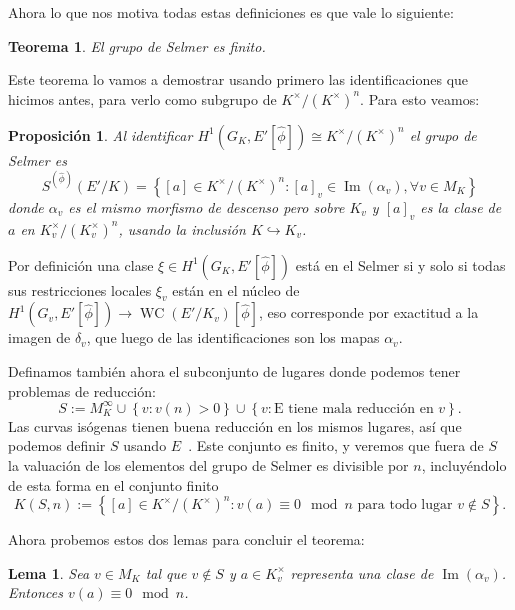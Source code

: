 \documentclass[a4paper]{book}
\theoremstyle{definition}
\theoremstyle{plain}
\newtheorem*{theorem*}{Teorema}
\newtheorem*{lemma*}{Lema}
\newtheorem*{prop*}{Proposición}
\DeclareMathOperator{\im}{Im}
\newcommand{\KmodN}{K^\times/{(K^\times)}^n}
\newcommand{\lla}{\left\lbrace}
\newcommand{\rla}{\right\rbrace}
\begin{document}
Ahora lo que nos motiva todas estas definiciones es que vale lo siguiente:

\begin{theorem*}
El grupo de Selmer es finito.
\end{theorem*}

Este teorema lo vamos a demostrar usando primero las identificaciones que hicimos antes, para verlo como subgrupo de $\KmodN$. Para esto veamos:

\begin{prop*}
Al identificar $H^1(G_K,E'[\hat\phi]) \cong \KmodN$ el grupo de Selmer es
\[
S^{(\hat\phi)}(E'/K) = \lla [a] \in \KmodN : {[a]}_v \in \im(\alpha_v), \forall v\in M_K \rla
\]
donde $\alpha_v$ es el mismo morfismo de descenso pero sobre $K_v$ y ${[a]}_v$ es la clase de $a$ en $K_v^\times/{(K_v^\times)}^n$, usando la inclusión $K\hookrightarrow K_v$. 
\end{prop*}

Por definición una clase $\xi \in H^1(G_K,E'[\hat\phi])$ está en el Selmer si y solo si todas sus restricciones locales $\xi_v$ están en el núcleo de $H^1(G_v,E'[\hat\phi]) \to \operatorname{WC}(E'/K_v)[\hat\phi]$, eso corresponde por exactitud a la imagen de $\delta_v$, que luego de las identificaciones son los mapas $\alpha_v$.

Definamos también ahora el subconjunto de lugares donde podemos tener problemas de reducción: 
\[
S:=M_K^\infty \cup \lla v: v(n)>0 \rla \cup \lla v: \text{E tiene mala reducción en $v$} \rla.
\]
Las curvas isógenas tienen buena reducción en los mismos lugares, así que podemos definir $S$ usando $E$~\cite[cap.~VII, corolario~7.2]{SilvermanAEC}.
Este conjunto es finito, y veremos que fuera de $S$ la valuación de los elementos del grupo de Selmer es divisible por $n$, incluyéndolo de esta forma en el conjunto finito
\[
K(S,n) := \lla [a] \in \KmodN : v(a)\equiv 0 \mod n \text{ para todo lugar } v \notin S \rla.
\]

Ahora probemos estos dos lemas para concluir el teorema:

\begin{lemma*}
Sea $v\in M_K$ tal que $v\notin S$ y $a\in K_v^\times$ representa una clase de $\im(\alpha_v)$. Entonces $v(a) \equiv 0 \mod n$. 
\end{lemma*}
\end{document}
